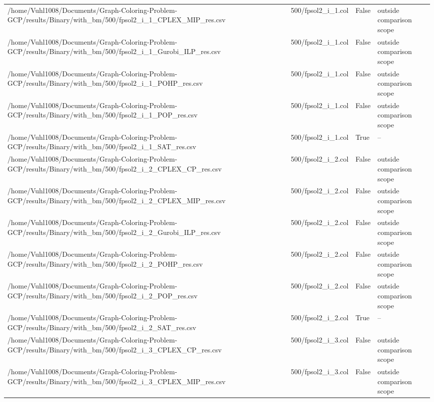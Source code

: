 \begin{table}[htbp]
\begin{tabular}{llll}
/home/Vuhl1008/Documents/Graph-Coloring-Problem-GCP/results/Binary/with\_bm/500/fpsol2\_i\_1\_CPLEX\_MIP\_res.csv & 500/fpsol2\_i\_1.col & False & outside comparison scope \\
/home/Vuhl1008/Documents/Graph-Coloring-Problem-GCP/results/Binary/with\_bm/500/fpsol2\_i\_1\_Gurobi\_ILP\_res.csv & 500/fpsol2\_i\_1.col & False & outside comparison scope \\
/home/Vuhl1008/Documents/Graph-Coloring-Problem-GCP/results/Binary/with\_bm/500/fpsol2\_i\_1\_POHP\_res.csv & 500/fpsol2\_i\_1.col & False & outside comparison scope \\
/home/Vuhl1008/Documents/Graph-Coloring-Problem-GCP/results/Binary/with\_bm/500/fpsol2\_i\_1\_POP\_res.csv & 500/fpsol2\_i\_1.col & False & outside comparison scope \\
/home/Vuhl1008/Documents/Graph-Coloring-Problem-GCP/results/Binary/with\_bm/500/fpsol2\_i\_1\_SAT\_res.csv & 500/fpsol2\_i\_1.col & True & -- \\
/home/Vuhl1008/Documents/Graph-Coloring-Problem-GCP/results/Binary/with\_bm/500/fpsol2\_i\_2\_CPLEX\_CP\_res.csv & 500/fpsol2\_i\_2.col & False & outside comparison scope \\
/home/Vuhl1008/Documents/Graph-Coloring-Problem-GCP/results/Binary/with\_bm/500/fpsol2\_i\_2\_CPLEX\_MIP\_res.csv & 500/fpsol2\_i\_2.col & False & outside comparison scope \\
/home/Vuhl1008/Documents/Graph-Coloring-Problem-GCP/results/Binary/with\_bm/500/fpsol2\_i\_2\_Gurobi\_ILP\_res.csv & 500/fpsol2\_i\_2.col & False & outside comparison scope \\
/home/Vuhl1008/Documents/Graph-Coloring-Problem-GCP/results/Binary/with\_bm/500/fpsol2\_i\_2\_POHP\_res.csv & 500/fpsol2\_i\_2.col & False & outside comparison scope \\
/home/Vuhl1008/Documents/Graph-Coloring-Problem-GCP/results/Binary/with\_bm/500/fpsol2\_i\_2\_POP\_res.csv & 500/fpsol2\_i\_2.col & False & outside comparison scope \\
/home/Vuhl1008/Documents/Graph-Coloring-Problem-GCP/results/Binary/with\_bm/500/fpsol2\_i\_2\_SAT\_res.csv & 500/fpsol2\_i\_2.col & True & -- \\
/home/Vuhl1008/Documents/Graph-Coloring-Problem-GCP/results/Binary/with\_bm/500/fpsol2\_i\_3\_CPLEX\_CP\_res.csv & 500/fpsol2\_i\_3.col & False & outside comparison scope \\
/home/Vuhl1008/Documents/Graph-Coloring-Problem-GCP/results/Binary/with\_bm/500/fpsol2\_i\_3\_CPLEX\_MIP\_res.csv & 500/fpsol2\_i\_3.col & False & outside comparison scope \\

\end{tabular}
\end{table}
